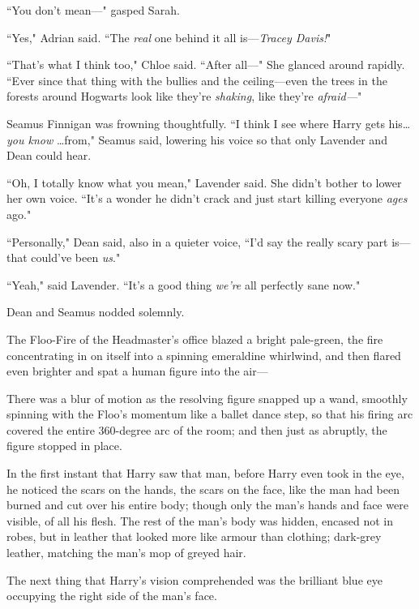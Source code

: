 ``You don't mean—" gasped Sarah.

``Yes," Adrian said. ``The \emph{real} one behind it all is—\emph{Tracey Davis!}"

``That's what I think too," Chloe said. ``After all—" She glanced around rapidly. ``Ever since that thing with the bullies and the ceiling—even the trees in the forests around Hogwarts look like they're \emph{shaking}, like they're \emph{afraid—}"

Seamus Finnigan was frowning thoughtfully. ``I think I see where Harry gets his{\ldots} \emph{you know} {\ldots}from," Seamus said, lowering his voice so that only Lavender and Dean could hear.

``Oh, I totally know what you mean," Lavender said. She didn't bother to lower her own voice. ``It's a wonder he didn't crack and just start killing everyone \emph{ages} ago."

``Personally," Dean said, also in a quieter voice, ``I'd say the really scary part is—that could've been \emph{us}."

``Yeah," said Lavender. ``It's a good thing \emph{we're} all perfectly sane now."

Dean and Seamus nodded solemnly.


The Floo-Fire of the Headmaster's office blazed a bright pale-green, the fire concentrating in on itself into a spinning emeraldine whirlwind, and then flared even brighter and spat a human figure into the air—

There was a blur of motion as the resolving figure snapped up a wand, smoothly spinning with the Floo's momentum like a ballet dance step, so that his firing arc covered the entire 360-degree arc of the room; and then just as abruptly, the figure stopped in place.

In the first instant that Harry saw that man, before Harry even took in the eye, he noticed the scars on the hands, the scars on the face, like the man had been burned and cut over his entire body; though only the man's hands and face were visible, of all his flesh. The rest of the man's body was hidden, encased not in robes, but in leather that looked more like armour than clothing; dark-grey leather, matching the man's mop of greyed hair.

The next thing that Harry's vision comprehended was the brilliant blue eye occupying the right side of the man's face.

